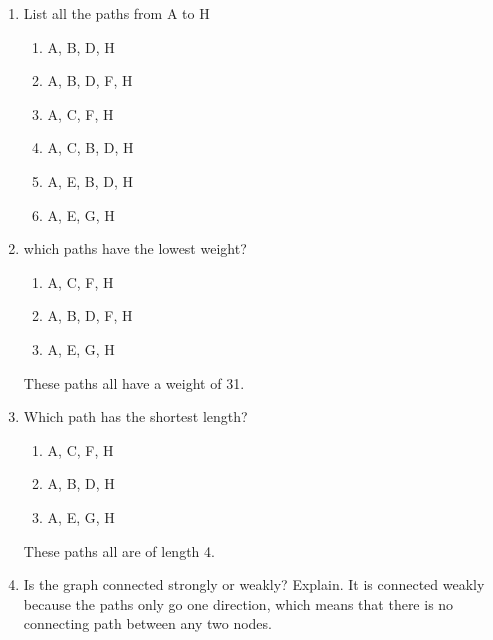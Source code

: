 \documentclass[11pt]{article}
\begin{document}
\begin{enumerate}

\item List all the paths from A to H 
\begin{enumerate}
    \item[] A, B, D, H
    \item[] A, B, D, F, H
    \item[] A, C, F, H
    \item[] A, C, B, D, H
    \item[] A, E, B, D, H
    \item[] A, E, G, H
\end{enumerate}

\item which paths have the lowest weight?
\begin{enumerate}
    \item[] A, C, F, H
    \item[] A, B, D, F, H
    \item[] A, E, G, H
\end{enumerate}
These paths all have a weight of 31. 

\item Which path has the shortest length?
\begin{enumerate}
    \item[] A, C, F, H
    \item[] A, B, D, H
    \item[] A, E, G, H
\end{enumerate}
These paths all are of length 4.

\item Is the graph connected strongly or weakly? Explain. \newline 
It is connected weakly because the paths only go one direction, which means that there is no connecting path between any two nodes.  

\end{enumerate}
\end{document}
